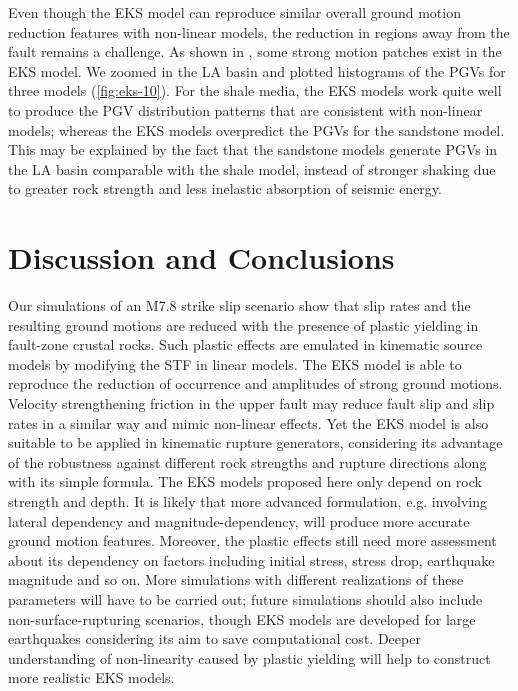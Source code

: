 Even though the EKS model can reproduce similar overall ground motion reduction features with non-linear models, the reduction in regions away from the fault remains a challenge. As shown in , some strong motion patches exist in the EKS model. We zoomed in the LA basin and plotted histograms of the PGVs for three models (\cref{fig:eks-10}). For the shale media, the EKS models work quite well to produce the PGV distribution patterns that are consistent with non-linear models; whereas the EKS models overpredict the PGVs for the sandstone model. This may be explained by the fact that the sandstone models generate PGVs in the LA basin comparable with the shale model, instead of stronger shaking due to greater rock strength and less inelastic absorption of seismic energy.


\section{Discussion and Conclusions}\label{eks:conclusions}
Our simulations of an M7.8 strike slip scenario show that slip rates and the resulting ground motions are reduced with the presence of plastic yielding in fault-zone crustal rocks. Such plastic effects are emulated in kinematic source models by modifying the STF in linear models. The EKS model is able to reproduce the reduction of occurrence and amplitudes of strong ground motions. Velocity strengthening friction in the upper fault may reduce fault slip and slip rates in a similar way and mimic non-linear effects. Yet the EKS model is also suitable to be applied in kinematic rupture generators, considering its advantage of the robustness against different rock strengths and rupture directions along with its simple formula.
The EKS models proposed here only depend on rock strength and depth. It is likely that more advanced formulation, e.g. involving lateral dependency and magnitude-dependency, will produce more accurate ground motion features. Moreover, the plastic effects still need more assessment about its dependency on factors including initial stress, stress drop, earthquake magnitude and so on. More simulations with different realizations of these parameters will have to be carried out; future simulations should also include non-surface-rupturing scenarios, though EKS models are developed for large earthquakes considering its aim to save computational cost. Deeper understanding of non-linearity caused by plastic yielding will help to construct more realistic EKS models.


